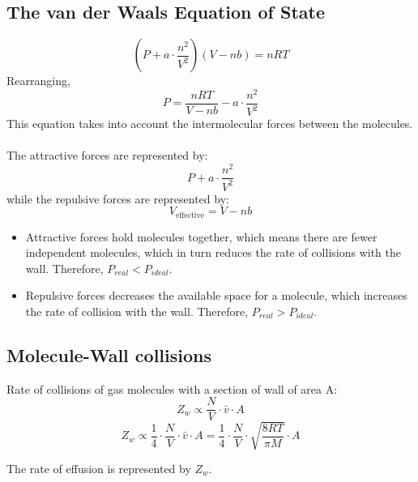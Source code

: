 \documentclass[10pt]{article}
\begin{document}
\subsection*{The van der Waals Equation of State}
\[\left(P + a \cdot \frac{n^2}{V^2}\right)(V - nb) = nRT\]
Rearranging,
\[P = \frac{nRT}{V - nb} - a \cdot \frac{n^2}{V^2}\]
This equation takes into account the intermolecular forces between the molecules.\\\\
The attractive forces are represented by:
\[P + a \cdot \frac{n^2}{V^2}\]
while the repulsive forces are represented by:
\[V_{\text{effective}} = V - nb\]
\begin{itemize}
    \item Attractive forces hold molecules together, which means there are fewer independent molecules, which in turn reduces the rate of collisions with the wall.  Therefore, $P_{real} < P_{ideal}$.
    \item Repulsive forces decreases the available space for a molecule, which increases the rate of collision with the wall.  Therefore, $P_{real} > P_{ideal}$.
\end{itemize}

\subsection*{Molecule-Wall collisions}
Rate of collisions of gas molecules with a section of wall of area A:
\[Z_w \propto \frac{N}{V} \cdot \bar v \cdot A\]
\[Z_w \propto \frac{1}{4} \cdot \frac{N}{V} \cdot \bar v \cdot A = \frac{1}{4} \cdot \frac{N}{V} \cdot \sqrt{\frac{8RT}{\pi M}} \cdot A\]

The rate of effusion is represented by $Z_w$.
\end{document}
